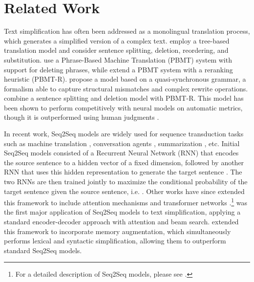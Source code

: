 \documentclass[11pt,a4paper]{article}
\begin{document}
\section{Related Work}

Text simplification has often been addressed as a monolingual translation process, which generates a simplified version of a complex text.  employ a tree-based translation model and consider sentence splitting, deletion, reordering, and substitution.  use a Phrase-Based Machine Translation (PBMT) system with support for deleting phrases, while   extend a PBMT system with a reranking heuristic (PBMT-R).  propose a model based on a quasi-synchronous grammar, a formalism able to capture structural mismatches and complex rewrite operations.  combine a sentence splitting and deletion model with PBMT-R. This model has been shown to perform competitively with neural models on automatic metrics, though it is outperformed using human judgments \cite{zhang2017sentence}.

In recent work, Seq2Seq models are widely used for sequence transduction tasks such as machine translation \cite{sutskever2014sequence,luong2015effective}, conversation agents \cite{vinyals2015neural}, summarization \cite{nallapati2016abstractive}, etc. Initial Seq2Seq models consisted of a Recurrent Neural Network (RNN) that encodes the source sentence  
to a hidden vector of a fixed dimension, followed by another RNN that uses this hidden representation to generate the target sentence . The two RNNs are then trained jointly to maximize the conditional probability of the target sentence given the source sentence, i.e. . Other works have since extended this framework to include attention mechanisms \cite{luong2015effective} and transformer networks \cite{vaswani2017attention}.\footnote{For a detailed description of Seq2Seq models, please see \cite{sutskever2014sequence}.} 
was the first major application of Seq2Seq models to text simplification, applying a standard encoder-decoder approach with attention and beam search.
 extended this framework to incorporate memory augmentation, which simultaneously performs lexical and syntactic simplification, allowing them to outperform standard Seq2Seq models.
\end{document}

